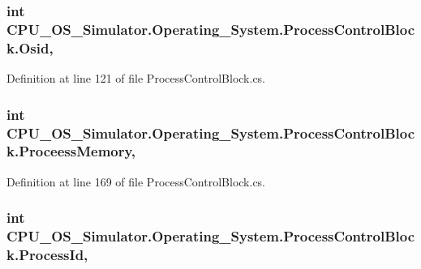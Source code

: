 \subsubsection[{Osid}]{\setlength{\rightskip}{0pt plus 5cm}int C\+P\+U\+\_\+\+O\+S\+\_\+\+Simulator.\+Operating\+\_\+\+System.\+Process\+Control\+Block.\+Osid\hspace{0.3cm}{\ttfamily [get]}, {\ttfamily [set]}}\label{class_c_p_u___o_s___simulator_1_1_operating___system_1_1_process_control_block_a4543f27a0bafc028e2a76e7ff301d48f}


Definition at line 121 of file Process\+Control\+Block.\+cs.

\hypertarget{class_c_p_u___o_s___simulator_1_1_operating___system_1_1_process_control_block_a7a73f2ca49a669fc3d2693ee6d0b8aff}{}
\subsubsection[{Proceess\+Memory}]{\setlength{\rightskip}{0pt plus 5cm}int C\+P\+U\+\_\+\+O\+S\+\_\+\+Simulator.\+Operating\+\_\+\+System.\+Process\+Control\+Block.\+Proceess\+Memory\hspace{0.3cm}{\ttfamily [get]}, {\ttfamily [set]}}\label{class_c_p_u___o_s___simulator_1_1_operating___system_1_1_process_control_block_a7a73f2ca49a669fc3d2693ee6d0b8aff}


Definition at line 169 of file Process\+Control\+Block.\+cs.

\hypertarget{class_c_p_u___o_s___simulator_1_1_operating___system_1_1_process_control_block_a65da99ff450282dcbc4d43288237f0e9}{}
\subsubsection[{Process\+Id}]{\setlength{\rightskip}{0pt plus 5cm}int C\+P\+U\+\_\+\+O\+S\+\_\+\+Simulator.\+Operating\+\_\+\+System.\+Process\+Control\+Block.\+Process\+Id\hspace{0.3cm}{\ttfamily [get]}, {\ttfamily [set]}}\label{class_c_p_u___o_s___simulator_1_1_operating___system_1_1_process_control_block_a65da99ff450282dcbc4d43288237f0e9}


